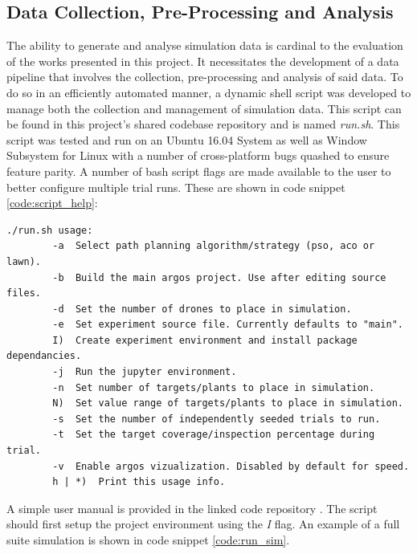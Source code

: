 \documentclass{report}
\newenvironment{code}{\captionsetup{type=listing}}{}
\begin{document}
\newpage

\subsection{Data Collection, Pre-Processing and Analysis}
The ability to generate and analyse simulation data is cardinal to the evaluation of the works presented in this project. It necessitates the development of a data pipeline that involves the collection, pre-processing and analysis of said data. To do so in an efficiently automated manner, a dynamic shell script was developed to manage both the collection and management of simulation data. This script can be found in this project's shared codebase repository \cite{SWARMCODE} and is named \textit{run.sh}. This script was tested and run on an Ubuntu 16.04 System as well as Window Subsystem for Linux with a number of cross-platform bugs quashed to ensure feature parity. A number of bash script flags are made available to the user to better configure multiple trial runs. These are shown in code snippet \ref{code:script_help}:

\begin{code}
\begin{verbatim}
./run.sh usage:
        -a  Select path planning algorithm/strategy (pso, aco or lawn).
        -b  Build the main argos project. Use after editing source files.
        -d  Set the number of drones to place in simulation.
        -e  Set experiment source file. Currently defaults to "main".
        I)  Create experiment environment and install package dependancies.
        -j  Run the jupyter environment.
        -n  Set number of targets/plants to place in simulation.
        N)  Set value range of targets/plants to place in simulation.
        -s  Set the number of independently seeded trials to run.
        -t  Set the target coverage/inspection percentage during trial.
        -v  Enable argos vizualization. Disabled by default for speed.
        h | *)  Print this usage info.
\end{verbatim}
\label{code:script_help}
\end{code}
\vspace{1cm}

A simple user manual is provided in the linked code repository \cite{SWARMCODE}. The script should first setup the project environment using the \textit{I} flag. An example of a full suite simulation is shown in code snippet \ref{code:run_sim}.
\end{document}
